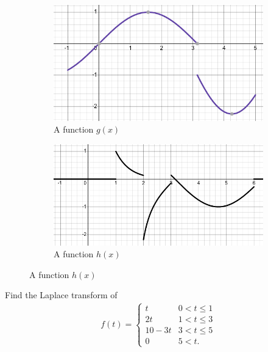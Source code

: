 \documentclass[12pt,a4paper]{article}
\newcounter{example}[section]
\begin{document}
\begin{figure}[ht]
		\begin{subfigure}[b]{0.45\textwidth}
			\centering
			\includegraphics[scale=0.4]{PieceCont2.png}
			\caption{A function $g(x)$}
		\end{subfigure}
		\hfill
		\begin{subfigure}[b]{0.45\textwidth}
			\centering
			\includegraphics[scale=0.35]{PieceCont3.png}
			\caption{A function $h(x)$}
		\end{subfigure}
	\end{figure}
	
	\newpage
	
	\begin{example}\label{Exa:PieceWiseFct}
	Find the Laplace transform of
		\begin{align*}
		f(t) = \left\{ 
			\begin{matrix}
			t & 0 < t \leq 1 \\
			2t & 1 < t \leq 3 \\
			10 - 3t & 3 < t \leq 5 \\
			0 & 5 < t .
			\end{matrix}
			\right.
		\end{align*}
	\end{example}
	
\end{document}
